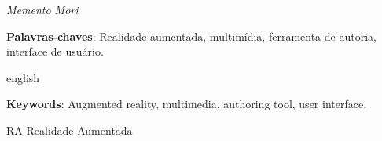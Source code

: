 \documentclass[
	12pt,				%
	openright,			%
	oneside,			%
	a4paper,			%
	ho do papel. 
	english,			%
	french,				%
	spanish,			%
	brazil,				%
	]{abntex2}
\begin{document}

\begin{agradecimentos}


\end{agradecimentos}

\begin{epigrafe} 
\vspace*{\fill} 
\begin{flushright} 
\textit{Memento Mori} 
\end{flushright} 
\end{epigrafe} 



\begin{resumo}
 

\noindent
\textbf{Palavras-chaves}: Realidade aumentada, multimídia, ferramenta de autoria, interface de usuário.

\end{resumo}

% 
\begin{resumo}[Abstract]
\begin{otherlanguage*}{english}


\noindent
\textbf{Keywords}: Augmented reality, multimedia, authoring tool, user interface.
\end{otherlanguage*}
\end{resumo}
\cleardoublepage
\listoffigures*
\cleardoublepage

\listoftables*
\cleardoublepage

\begin{siglas}

  \item[RA] Realidade Aumentada
  
  
\end{siglas}
\end{document}
